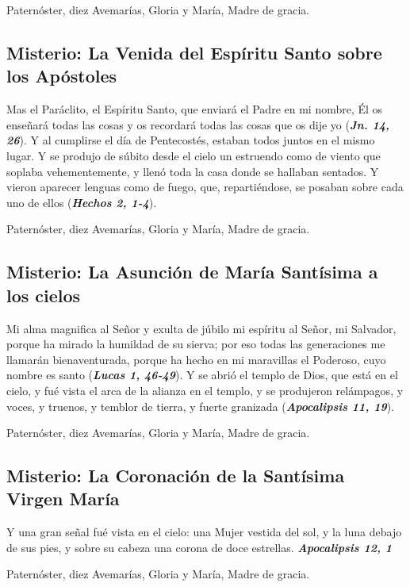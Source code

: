 \documentclass[./main.tex]{subfiles}
\newcounter{glorious-counter}
\begin{document}
\begin{center}
      Paternóster, diez Avemarías, Gloria y María, Madre de gracia.
\end{center}

\subsection*{ Misterio: La Venida del Espíritu Santo sobre los Apóstoles}

Mas el Paráclito, el Espíritu Santo, que enviará el Padre en mi nombre, Él os enseñará todas las cosas y os recordará todas las cosas que os dije yo (\textbf{\emph{Jn. 14, 26}}). 
Y al cumplirse el día de Pentecostés, estaban todos juntos en el mismo lugar. Y se produjo de súbito desde el cielo un estruendo como de viento que soplaba vehementemente, 
y llenó toda la casa donde se hallaban sentados. Y vieron aparecer lenguas como de fuego, que, repartiéndose, se posaban sobre cada uno de ellos (\textbf{\emph{Hechos 2, 1-4}}).

\begin{center}
      Paternóster, diez Avemarías, Gloria y María, Madre de gracia.
\end{center}

\subsection*{ Misterio: La Asunción de María Santísima a los cielos}

Mi alma magnifica al Señor y exulta de júbilo mi espíritu al Señor, mi Salvador, porque ha mirado la humildad de su sierva; por eso todas las generaciones
me llamarán bienaventurada, porque ha hecho en mi maravillas el Poderoso, cuyo nombre es santo (\textbf{\emph{Lucas 1, 46-49}}).  Y se abrió el templo de Dios, que está en el cielo, y 
fué vista el arca de la alianza en el templo, y se produjeron relámpagos, y voces, y truenos, y temblor de tierra, y fuerte granizada (\textbf{\emph{Apocalipsis 11, 19}}).

\begin{center}
      Paternóster, diez Avemarías, Gloria y María, Madre de gracia.
\end{center}

\subsection*{ Misterio: La Coronación de la Santísima Virgen María}

Y una gran señal fué vista en el cielo: una Mujer vestida del sol, y la luna debajo de sus pies, y sobre su cabeza una corona de doce estrellas. 
\textbf{\emph{Apocalipsis 12, 1}}

\begin{center}
      Paternóster, diez Avemarías, Gloria y María, Madre de gracia.
\end{center}
\end{document}
